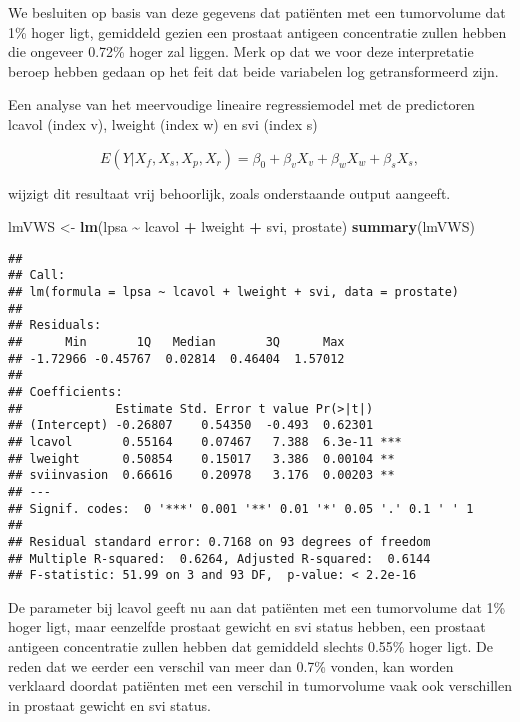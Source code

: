 \documentclass[
  12pt,dutch,coursenotes]{book}
\newenvironment{Shaded}{\begin{snugshade}}{\end{snugshade}}
\newcommand{\KeywordTok}[1]{\textcolor[rgb]{0.13,0.29,0.53}{\textbf{#1}}}
\newcommand{\NormalTok}[1]{#1}
\newcommand{\OperatorTok}[1]{\textcolor[rgb]{0.81,0.36,0.00}{\textbf{#1}}}
\newcommand{\StringTok}[1]{\textcolor[rgb]{0.31,0.60,0.02}{#1}}
\theoremstyle{definition}
\theoremstyle{definition}
\theoremstyle{definition}
\theoremstyle{remark}
\begin{document}
We besluiten op basis van deze gegevens dat patiënten met een tumorvolume dat 1\% hoger ligt, gemiddeld gezien een prostaat antigeen concentratie zullen hebben die ongeveer 0.72\% hoger zal liggen. Merk op dat we voor deze interpretatie beroep hebben gedaan op het feit dat beide variabelen log getransformeerd zijn.

Een analyse van het meervoudige lineaire regressiemodel met de predictoren lcavol (index v), lweight (index w) en svi (index s)

\[
E(Y|X_f,X_s,X_p,X_r)=\beta_0 +\beta_v X_v+\beta_w X_w+\beta_s X_s,
\]

wijzigt dit resultaat vrij behoorlijk, zoals onderstaande output aangeeft.

\begin{Shaded}
\begin{Highlighting}[]
\NormalTok{lmVWS \textless{}{-}}\StringTok{ }\KeywordTok{lm}\NormalTok{(lpsa }\OperatorTok{\textasciitilde{}}\StringTok{ }\NormalTok{lcavol }\OperatorTok{+}\StringTok{ }\NormalTok{lweight }\OperatorTok{+}\StringTok{ }\NormalTok{svi, prostate)}
\KeywordTok{summary}\NormalTok{(lmVWS)}
\end{Highlighting}
\end{Shaded}

\begin{verbatim}
## 
## Call:
## lm(formula = lpsa ~ lcavol + lweight + svi, data = prostate)
## 
## Residuals:
##      Min       1Q   Median       3Q      Max 
## -1.72966 -0.45767  0.02814  0.46404  1.57012 
## 
## Coefficients:
##             Estimate Std. Error t value Pr(>|t|)    
## (Intercept) -0.26807    0.54350  -0.493  0.62301    
## lcavol       0.55164    0.07467   7.388  6.3e-11 ***
## lweight      0.50854    0.15017   3.386  0.00104 ** 
## sviinvasion  0.66616    0.20978   3.176  0.00203 ** 
## ---
## Signif. codes:  0 '***' 0.001 '**' 0.01 '*' 0.05 '.' 0.1 ' ' 1
## 
## Residual standard error: 0.7168 on 93 degrees of freedom
## Multiple R-squared:  0.6264, Adjusted R-squared:  0.6144 
## F-statistic: 51.99 on 3 and 93 DF,  p-value: < 2.2e-16
\end{verbatim}

De parameter bij lcavol geeft nu aan dat patiënten met een tumorvolume dat 1\% hoger ligt, maar eenzelfde prostaat gewicht en svi status hebben, een prostaat antigeen concentratie zullen hebben dat gemiddeld slechts 0.55\% hoger ligt.
De reden dat we eerder een verschil van meer dan 0.7\% vonden, kan worden verklaard doordat patiënten met een verschil in tumorvolume vaak ook verschillen in prostaat gewicht en svi status.
\end{document}
